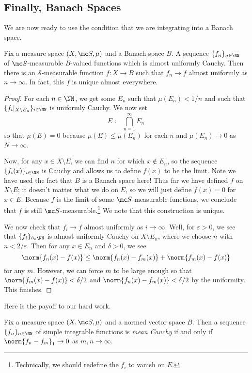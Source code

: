\documentclass[../notes.tex]{subfiles}
\begin{document}
\subsection{Finally, Banach Spaces}
We are now ready to use the condition that we are integrating into a Banach space.
\begin{lemma}
	Fix a measure space $(X,\mc S,\mu)$ and a Banach space $B$. A sequence $\{f_n\}_{n\in\NN}$ of $\mc S$-measurable $B$-valued functions which is almost uniformly Cauchy. Then there is an $\mathcal S$-measurable function $f\colon X\to B$ such that $f_n\to f$ almost uniformly as $n\to\infty$. In fact, this $f$ is unique almost everywhere.
\end{lemma}
\begin{proof}
	For each $n\in\NN$, we get some $E_n$ such that $\mu(E_n)<1/n$ and such that $\{f_i|_{X\setminus E_n}\}_{i\in\NN}$ is uniformly Cauchy. We now set
	\[E\coloneqq\bigcap_{n=1}^\infty E_n\]
	so that $\mu(E)=0$ because $\mu(E)\le\mu(E_n)$ for each $n$ and $\mu(E_n)\to0$ as $N\to\infty$.

	Now, for any $x\in X\setminus E$, we can find $n$ for which $x\notin E_n$, so the sequence $\{f_i(x)\}_{i\in\NN}$ is Cauchy and allows us to define $f(x)$ to be the limit. Note we have used the fact that $B$ is a Banach space here! Thus far we have defined $f$ on $X\setminus E$; it doesn't matter what we do on $E$, so we will just define $f(x)=0$ for $x\in E$. Because $f$ is the limit of some $\mc S$-measurable functions, we conclude that $f$ is still $\mc S$-measurable.\footnote{Technically, we should redefine the $f_i$ to vanish on $E$.} We note that this construction is unique.

	We now check that $f_i\to f$ almost uniformly as $i\to\infty$. Well, for $\varepsilon>0$, we see that $\{f_i\}_{i\in\NN}$ is almost uniformly Cauchy on $X\setminus E_n$, where we choose $n$ with $n<2/\varepsilon$. Then for any $x\in E_n$ and $\delta>0$, we see
	\[\norm{f_n(x)-f(x)}\le\norm{f_n(x)-f_m(x)}+\norm{f_m(x)-f(x)}\]
	for any $m$. However, we can force $m$ to be large enough so that $\norm{f_m(x)-f(x)}<\delta/2$ and $\norm{f_n(x)-f_m(x)}<\delta/2$ by the uniformity. This finishes.
\end{proof}
Here is the payoff to our hard work.
\begin{definition}
	Fix a measure space $(X,\mc S,\mu)$ and a normed vector space $B$. Then a sequence $\{f_n\}_{n\in\NN}$ of simple integrable functions is \textit{mean Cauchy} if and only if $\norm{f_n-f_m}_1\to0$ as $m,n\to\infty$.
\end{definition}
\end{document}
